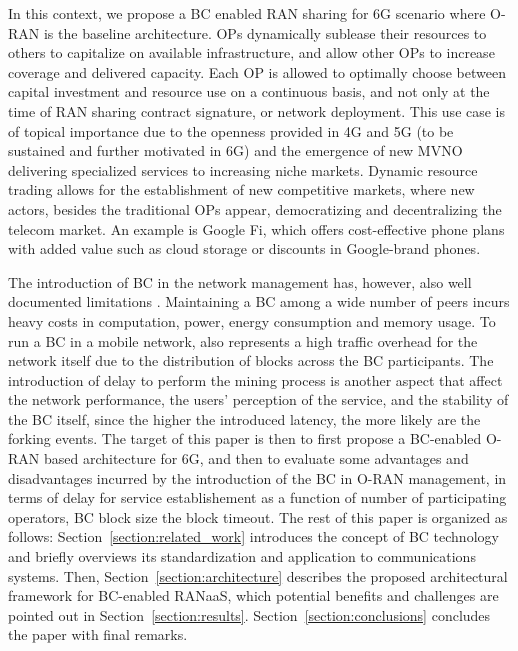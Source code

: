 \documentclass[journal]{IEEEtran}
\begin{document}
In this context, we propose a BC enabled RAN sharing for 6G scenario where O-RAN is the baseline architecture. OPs dynamically sublease their resources to others to capitalize on available infrastructure, and allow other OPs to increase coverage and delivered capacity. Each OP is allowed to optimally choose between capital investment and resource use on a continuous basis, and not only at the time of RAN sharing contract signature, or network deployment. This use case is of topical importance due to the openness provided in 4G and 5G (to be sustained and further motivated in 6G) and the emergence of new MVNO delivering specialized services to increasing niche markets. Dynamic resource trading allows for the establishment of new competitive markets, where new actors, besides the traditional OPs appear, democratizing and decentralizing the telecom market. An example is Google Fi, which offers cost-effective phone plans with added value such as cloud storage or discounts in Google-brand phones.

The introduction of BC in the network management has, however, also well documented limitations \cite{FWilhelmi_PIMRC}. Maintaining a BC among a wide number of peers incurs heavy costs in computation, power, energy consumption and memory usage. 
To run a BC in a mobile network, also represents a high traffic overhead for the network itself due to the distribution of blocks across the BC participants. The introduction of delay to perform the mining process is another aspect that affect the network performance, the users' perception of the service, and the stability of the BC itself, since the higher the introduced latency, the more likely are the forking events. The target of this paper is then to first propose a BC-enabled O-RAN based architecture for 6G, and then to evaluate some advantages and disadvantages incurred by the introduction of the BC in O-RAN management, in terms of delay for service establishement as a function of number of participating operators, BC block size the block timeout. The rest of this paper is organized as follows: Section~\ref{section:related_work} introduces the concept of BC technology and briefly overviews its standardization and application to communications systems. Then, Section~\ref{section:architecture} describes the proposed architectural framework for BC-enabled RANaaS, which potential benefits and challenges are pointed out in Section~\ref{section:results}. Section~\ref{section:conclusions} concludes the paper with final remarks.

\end{document}
